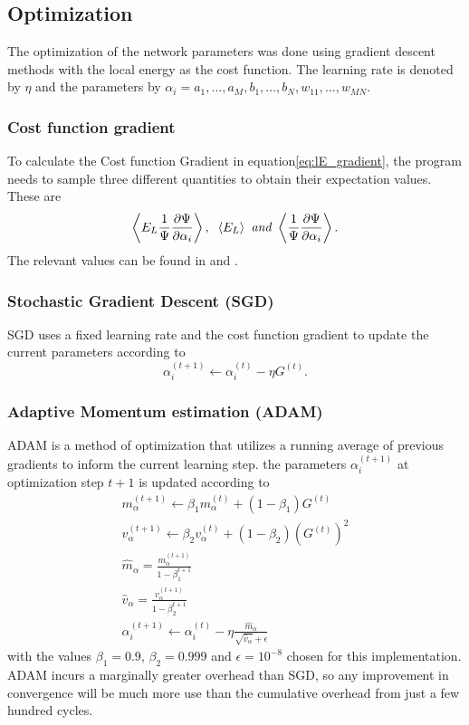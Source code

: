 \documentclass[11pt,a4paper,titlepage]{article}
\begin{document}
\subsection{Optimization}
The optimization of the network parameters was done using gradient descent methods with the local energy as the cost function. The learning rate is denoted by $\eta$ and the parameters by $\alpha_{i}=a_{1}, \ldots, a_{M}, b_{1}, \ldots, b_{N}, w_{11}, \ldots, w_{M N}$.
\subsubsection{Cost function gradient}
To calculate the Cost function Gradient in equation\eqref{eq:lE_gradient}, the program needs to sample three different quantities to obtain their expectation values.
These are
\begin{equation}
\left\langle E_{L} \frac{1}{\Psi} \frac{\partial \Psi}{\partial \alpha_{i}}\right\rangle, \hspace{2mm}\left\langle E_{L}\right\rangle\textit{ and }\left\langle\frac{1}{\Psi} \frac{\partial \Psi}{\partial \alpha_{i}}\right\rangle.
\end{equation}
The relevant values can be found in  and . 
\subsubsection{Stochastic Gradient Descent (SGD)}
SGD uses a fixed learning rate and the cost function gradient to update the current parameters according to 
$$
\alpha_i^{(t+1)} \leftarrow \alpha_i^{(t)}-\eta G^{(t)}.
$$
\subsubsection{Adaptive Momentum estimation (ADAM)}
ADAM is a method of optimization that utilizes a running average of previous gradients to inform the current learning step. the parameters  $\alpha_i^{(t+1)}$ at optimization step $t+1$ is updated according to
$$
\begin{array}{l}
m_{\alpha}^{(t+1)} \leftarrow \beta_{1} m_{\alpha}^{(t)}+\left(1-\beta_{1}\right) G^{(t)} \\
v_{\alpha}^{(t+1)} \leftarrow \beta_{2} v_{\alpha}^{(t)}+\left(1-\beta_{2}\right)\left(G^{(t)}\right)^{2} \\
\hat{m}_{\alpha}=\frac{m_{\alpha}^{(t+1)}}{1-\beta_{1}^{t+1}} \\
\hat{v}_{\alpha}=\frac{v_{\alpha}^{(t+1)}}{1-\beta_{2}^{t+1}} \\
\alpha_i^{(t+1)} \leftarrow \alpha_i^{(t)}-\eta \frac{\hat{m}_{\alpha}}{\sqrt{\hat{v}_{\alpha}}+\epsilon}
\end{array}
$$
with the values $\beta_{1} = 0.9$, $\beta_{2} = 0.999$ and $\epsilon = 10^{-8}$ chosen for this implementation. ADAM incurs a marginally greater overhead than SGD, so any improvement in convergence will be much more use than the cumulative overhead from just a few hundred cycles.
\end{document}
